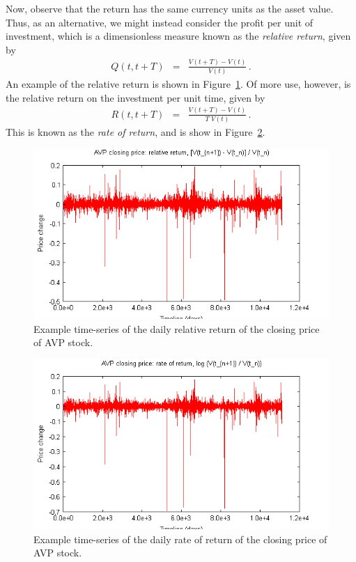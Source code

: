 \documentclass[a4paper]{book}
\begin{document}
Now, observe that the return has the same currency units as
the asset value. Thus, as an alternative, we might instead 
consider the profit per unit of investment, which is
a dimensionless measure 
known as the {\em relative return}, given by
\begin{eqnarray}
  Q(t,t+T) & = & \frac{V(t+T)-V(t)}{V(t)}\,.
\end{eqnarray}
An example of the relative return 
is shown in Figure~\ref{fig:avp-price-simple}.
Of more use, however,  is
the relative return on the investment per unit time, given by
\begin{eqnarray}
  R(t,t+T) & = & \frac{V(t+T)-V(t)}{T\;V(t)}\,.
\end{eqnarray}
This is known as the {\em rate of return}, and
is show in Figure~\ref{fig:avp-price-log}.
\begin{figure}[hbt]
\includegraphics[scale=0.8]{figures/avp-price-close-simple.png}
\caption{Example time-series of the daily relative return of
the closing price of AVP stock.}
\label{fig:avp-price-simple}
\end{figure}
\begin{figure}[hbt]
\includegraphics[scale=0.8]{figures/avp-price-close-log.png}
\caption{Example time-series of the daily rate of return of
the closing price of AVP stock.}
\label{fig:avp-price-log}
\end{figure}
\end{document}
